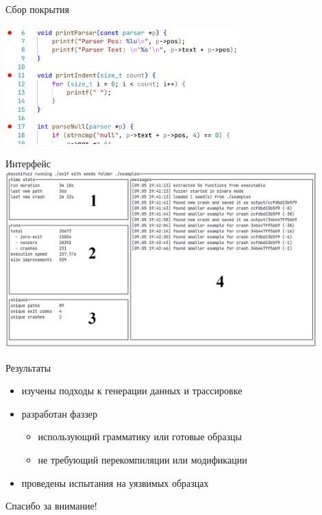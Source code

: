 \documentclass[hyperref={unicode=true}, 12pt]{beamer}
\begin{document}
	\begin{frame}[c]{Сбор покрытия}
			
		\centering \includegraphics[width=9cm]{breakpoints.png}
			
	\end{frame}

	
	\begin{frame}[t]{Интерфейс}
		\includegraphics[width=12cm]{tui.png}
	\end{frame}

	\begin{frame}[t]{Результаты}
		\vspace{1cm}
		\begin{itemize}
			\item изучены подходы к генерации данных и трассировке
			
			\item разработан фаззер
			\begin{itemize}
				\fontsize{11}{15}\selectfont
				\item использующий грамматику или готовые образцы
				\item не требующий перекомпиляции или модификации
			\end{itemize}
			\item проведены испытания на уязвимых образцах
		\end{itemize}
		
		\vspace{0.6cm}
		
	
	\end{frame}

	\begin{frame}[c]
		\fontsize{26}{24}\selectfont
		\centering Спасибо за внимание!
	\end{frame}
	
\end{document}
